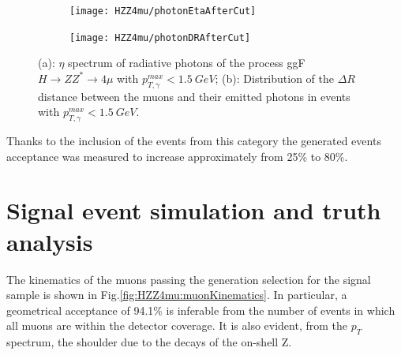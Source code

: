 \documentclass[a4paper,twoside,12pt]{book}
\begin{document}
\begin{figure}
\centering
\begin{subfigure}{.5\textwidth}
  \centering
  \texttt{[image: HZZ4mu/photonEtaAfterCut]}
  \caption{}
  \label{fig:HZZ4mu:photonEtaAfterCut}
\end{subfigure}%
\begin{subfigure}{.5\textwidth}
  \centering
  \texttt{[image: HZZ4mu/photonDRAfterCut]}
  \caption{}
  \label{fig:HZZ4mu:photonDRAfterCut}
\end{subfigure}
\caption{(a): $\eta$ spectrum of radiative photons of the process 
	ggF $H \rightarrow ZZ^* \rightarrow 4\mu$ with $p^{max}_{T, \gamma} < 1.5\ GeV$; 
	(b): Distribution of the $\Delta R$ distance between the muons and their emitted photons in events with $p^{max}_{T, \gamma} < 1.5\ GeV$.}
\label{fig:HZZ4mu:genPhotonsAfterCut}
\end{figure}

Thanks to the inclusion of the events from this category the generated events acceptance was measured to increase approximately from 25\% to 80\%.\\

\section{Signal event simulation and truth analysis}

The kinematics of the muons passing the generation selection for the 
signal sample is shown in 
Fig.\ref{fig:HZZ4mu:muonKinematics}. In particular, a geometrical acceptance of 94.1\%
is inferable from the number of events in which all muons are within the detector
coverage. It is also evident, from the $p_{T}$ spectrum, the shoulder due to the decays
of the on-shell Z.\\
\end{document}
